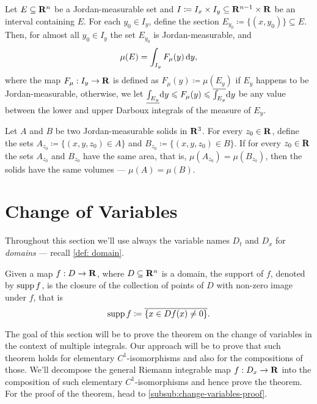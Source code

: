 \begin{corollary}
\label{cor:slicing-measurable-sets-and-integrating}
Let \(E \subseteq \mathbf{R}^n\) be a Jordan-measurable set and \(I \coloneq I_x \times
I_y \subseteq \mathbf{R}^{n-1} \times \mathbf{R}\) be an interval containing \(E\). For each
\(y_0 \in I_y\), define the section \(E_{y_0} \coloneq \{(x, y_{0})\} \subseteq
E\). Then, for almost all \(y_0 \in I_y\) the set \(E_{y_0}\) is
Jordan-measurable, and
\[
  \mu(E) = \int_{I_y} F_{\mu}(y)\, \mathrm{d} y,
\]
where the map \(F_{\mu}: I_y \to \mathbf{R}\) is defined as \(F_{\mu}(y) \coloneq
\mu(E_y)\) if \(E_y\) happens to be Jordan-measurable, otherwise, we let
\(\underline{\int_{E_y}} \mathrm{d} y \leqslant F_{\mu}(y) \leqslant \overline{\int_{E_y}}
\mathrm{d} y\) be any value between the lower and upper Darboux integrals of the
measure of \(E_y\).
\end{corollary}

\begin{corollary}
\label{cor:cavalieri-principle}
Let \(A\) and \(B\) be two Jordan-measurable solids in \(\mathbf{R}^3\). For every \(z_0
\in \mathbf{R}\), define the sets \(A_{z_0} \coloneq \{(x, y, z_{0}) \in A\}\) and
\(B_{z_0} \coloneq \{(x, y, z_{0}) \in B\}\). If for every \(z_0 \in \mathbf{R}\) the
sets \(A_{z_0}\) and \(B_{z_0}\) have the same area, that is, \(\mu(A_{z_0}) =
\mu(B_{z_0})\), then the solids have the same volumes --- \(\mu(A) = \mu(B)\).
\end{corollary}

\section{Change of Variables}

\begin{remark}
Throughout this section we'll use always the variable names \(D_t\) and \(D_x\)
for \emph{domains} --- recall \cref{def: domain}.
\end{remark}

\begin{definition}
\label{def:support-real-valued-map}
Given a map \(f: D \to \mathbf{R}\), where \(D \subseteq \mathbf{R}^n\) is a domain, the support
of \(f\), denoted by \(\operatorname{supp} f\), is the closure of the collection of points of
\(D\) with non-zero image under \(f\), that is
\[
  \operatorname{supp} f \coloneq \overline{\{x \in D \relax f(x) \neq 0\}}.
\]
\end{definition}

The goal of this section will be to prove the theorem on the change of variables
in the context of multiple integrals. Our approach will be to prove that such
theorem holds for elementary \(C^1\)-isomorphisms and also for the compositions
of those. We'll decompose the general Riemann integrable map \(f: D_x \to \mathbf{R}\)
into the composition of such elementary \(C^1\)-isomorphisms and hence prove the
theorem. For the proof of the theorem, head to
\cref{subsub:change-variables-proof}.

